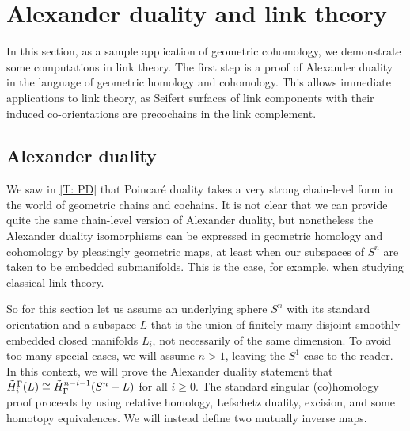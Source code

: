 
\section{Alexander duality and link theory}\label{S: Alexander}

In this section, as a sample application of geometric cohomology, we demonstrate some computations in link theory.
The first step is a proof of Alexander duality in the language of geometric homology and cohomology.
This allows immediate applications to link theory, as Seifert surfaces of link components with their induced co-orientations are precochains in the link complement.


\subsection{Alexander duality}


We saw in \cref{T: PD} that Poincar\'e duality takes a very strong chain-level form in the world of geometric chains and cochains.
It is not clear that we can provide quite the same chain-level version of Alexander duality, but nonetheless the Alexander duality isomorphisms can be expressed in geometric homology and cohomology by pleasingly geometric maps, at least when our subspaces of $S^n$ are taken to be embedded submanifolds.
This is the case, for example, when studying classical link theory.

So for this section let us assume an underlying sphere $S^n$ with its standard orientation and a subspace $L$ that is the union of finitely-many disjoint smoothly embedded closed manifolds $L_i$, not necessarily of the same dimension.
To avoid too many special cases, we will assume $n>1$, leaving the $S^1$ case to the reader.
In this context, we will prove the Alexander duality statement that $\tilde H_i^\Gamma(L) \cong \tilde H^{n-i-1}_\Gamma(S^n-L)$ for all $i \geq 0$.
The standard singular (co)homology proof proceeds by using relative homology, Lefschetz duality, excision, and some homotopy equivalences. We will instead define two mutually inverse maps.




